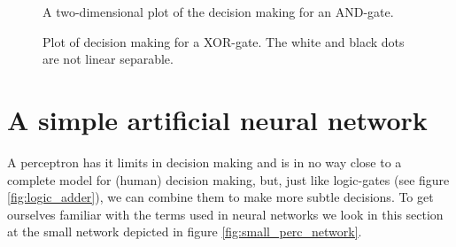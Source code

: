 \begin{figure}
\centering
{}
\caption{A two-dimensional plot of the decision making for an AND-gate. }
\label{fig:linairseperabilty_AND}
\end{figure}

\begin{figure}
\centering
{}
\caption{Plot of decision making for a XOR-gate. The white and black dots are not linear separable.}
\label{fig:linairseperabilty_EXNOR}
\end{figure}

\section{A simple artificial neural network}
A perceptron has it limits in decision making and is in no way close to a complete model for (human) decision making, but, just like logic-gates (see figure \ref{fig:logic_adder}), we can combine them to make more subtle decisions. To get ourselves familiar with the terms used in neural networks we look in this section at the small network depicted in figure \ref{fig:small_perc_network}.

